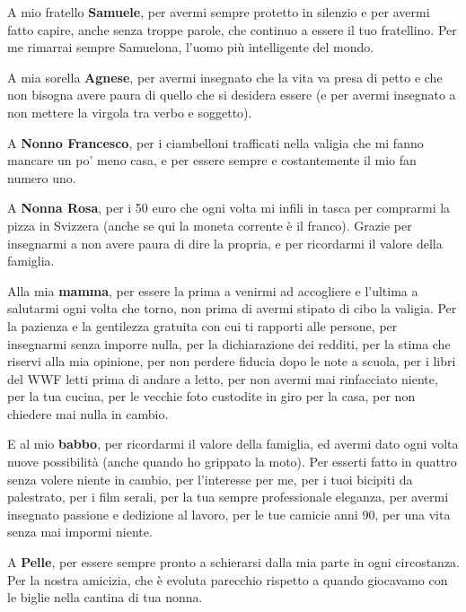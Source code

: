 {
  \setlength{\parskip}{1em}
  \setlength{\parindent}{0pt}

\vspace{3em}

A mio fratello \textbf{Samuele}, per avermi sempre protetto in silenzio e per avermi fatto capire, anche senza troppe parole, che continuo a essere il tuo fratellino. Per me rimarrai sempre Samuelona, l’uomo più intelligente del mondo.

A mia sorella \textbf{Agnese}, per avermi insegnato che la vita va presa di petto e che non bisogna avere paura di quello che si desidera essere (e per avermi insegnato a non mettere la virgola tra verbo e soggetto).

A \textbf{Nonno Francesco}, per i ciambelloni trafficati nella valigia che mi fanno mancare un po' meno casa, e per essere sempre e costantemente il mio fan numero uno.

A \textbf{Nonna Rosa}, per i 50 euro che ogni volta mi infili in tasca per comprarmi la pizza in Svizzera (anche se qui la moneta corrente è il franco). Grazie per insegnarmi a non avere paura di dire la propria, e per ricordarmi il valore della famiglia.

Alla mia \textbf{mamma}, per essere la prima a venirmi ad accogliere e l'ultima a salutarmi ogni volta che torno, non prima di avermi stipato di cibo la valigia. Per la pazienza e la gentilezza gratuita con cui ti rapporti alle persone, per insegnarmi senza imporre nulla, per la dichiarazione dei redditi, per la stima che riservi alla mia opinione, per non perdere fiducia dopo le note a scuola, per i libri del WWF letti prima di andare a letto, per non avermi mai rinfacciato niente, per la tua cucina, per le vecchie foto custodite in giro per la casa, per non chiedere mai nulla in cambio.

E al mio \textbf{babbo}, per ricordarmi il valore della famiglia, ed avermi dato ogni volta nuove possibilità (anche quando ho grippato la moto). Per esserti fatto in quattro senza volere niente in cambio, per l'interesse per me, per i tuoi bicipiti da palestrato, per i film serali, per la tua sempre professionale eleganza, per avermi insegnato passione e dedizione al lavoro, per le tue camicie anni 90, per una vita senza mai impormi niente.

A \textbf{Pelle}, per essere sempre pronto a schierarsi dalla mia parte in ogni circostanza. Per la nostra amicizia, che è evoluta parecchio rispetto a quando giocavamo con le biglie nella cantina di tua nonna.

}
